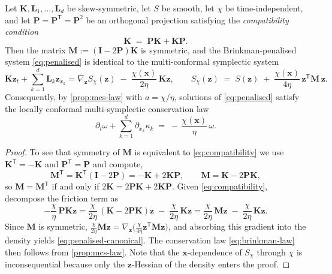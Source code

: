 \documentclass[10pt,a4paper]{amsart}
\newcommand{\bI}{\bm{I}}
\newcommand{\bK}{\bm{K}}
\newcommand{\bL}{\bm{L}}
\newcommand{\bM}{\bm{M}}
\newcommand{\bP}{\bm{P}}
\newcommand{\bx}{\bm{x}}
\newcommand{\bz}{\bm{z}}
\newcommand{\chixx}{\chi(\bx)}
\begin{document}
\begin{theorem}
\label{thm:general}
Let $\bK,\bL_1,\dots,\bL_d$ be skew-symmetric, let $S$ be smooth, let
$\chi$ be time-independent, and let $\bP=\bP^{\mathsf T}=\bP^2$ be an
orthogonal projection satisfying the \emph{compatibility condition}
\begin{equation}
\label{eq:compatibility}
\bK \;=\; \bP\bK + \bK\bP .
\end{equation}
Then the matrix $\bM:=(\bI-2\bP)\bK$ is symmetric, and the
Brinkman-penalised system \eqref{eq:penalised} is identical to the
multi-conformal symplectic system
\begin{equation}
\label{eq:penalised-canonical}
\bK\bz_t + \sum_{k=1}^{d}\bL_k\bz_{x_k}
= \nabla_{\bz}S_\chi(\bz) \;-\; \frac{\chixx}{2\eta}\,\bK\bz ,
\qquad
S_\chi(\bz)
\;=\;
S(\bz) \;+\; \frac{\chixx}{4\eta}\,\bz^{\mathsf T}\bM\,\bz .
\end{equation}
Consequently, by \cref{prop:mcs-law} with $a=\chi/\eta$, solutions of
\eqref{eq:penalised} satisfy the locally conformal multi-symplectic
conservation law
\begin{equation}
\label{eq:brinkman-law}
\partial_t\omega + \sum_{k=1}^{d}\partial_{x_k}\kappa_k
\;=\;
-\,\frac{\chixx}{\eta}\,\omega .
\end{equation}
\end{theorem}

\begin{proof}
To see that symmetry of $\bM$ is equivalent to \eqref{eq:compatibility} we use $\bK^{\mathsf T}=-\bK$ and $\bP^{\mathsf T}=\bP$ and compute,
\[
\bM^{\mathsf T} = \bK^{\mathsf T}(\bI-2\bP) = -\bK+2\bK\bP,
\qquad
\bM = \bK - 2\bP\bK ,
\]
so $\bM=\bM^{\mathsf T}$ if and only if $2\bK = 2\bP\bK+2\bK\bP$.
Given \eqref{eq:compatibility}, decompose the friction term as
\[
-\frac{\chi}{\eta}\,\bP\bK\bz
= \frac{\chi}{2\eta}\,(\bK-2\bP\bK)\bz
  \;-\;\frac{\chi}{2\eta}\,\bK\bz
= \frac{\chi}{2\eta}\,\bM\bz \;-\;\frac{\chi}{2\eta}\,\bK\bz .
\]
Since $\bM$ is symmetric,
$\frac{\chi}{2\eta}\bM\bz
= \nabla_{\bz}\bigl(\frac{\chi}{4\eta}\bz^{\mathsf T}\bM\bz\bigr)$,
and absorbing this gradient into the density yields
\eqref{eq:penalised-canonical}.  The conservation law
\eqref{eq:brinkman-law} then follows from \cref{prop:mcs-law}. Note
that the $\bx$-dependence of $S_\chi$ through $\chi$ is inconsequential
because only the $\bz$-Hessian of the density enters the proof.
\end{proof}
\end{document}
